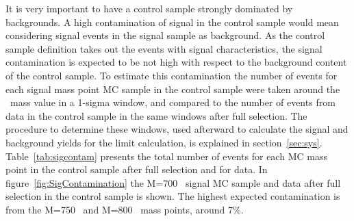 It is very important to have a control sample strongly dominated by backgrounds. A high contamination of signal in the control sample would mean considering signal events in the signal sample as background. As the control sample definition takes out the events with signal characteristics, the signal contamination is expected to be not high with respect to the background content of the control sample. To estimate this contamination the number of events for each signal mass point MC sample in the control sample were taken around the \Tp~mass value in a 1-sigma window, and compared to the number of events from data in the control sample in the same windows after full selection. The procedure to determine these windows, used afterward to calculate the signal and background yields for the limit calculation, is explained in section~\ref{sec:sys}. Table~\ref{tab:sigcontam} presents the total number of events for each MC mass point in the control sample after full selection and for data. In figure~\ref{fig:SigContamination} the M=700 \GeVcc~signal MC sample and data after full selection in the control sample is shown. The highest expected contamination is from the M=750 \GeVcc~and M=800 \GeVcc~mass points, around 7\%. %

\begin{table*}[htbH]
\begin{center}
\caption{Number of events in the control sample for signal MC samples and data after full selection in a window corresponding to one $\sigma$ for each mass point, as it will be explained in section~\ref{sec:sys}. The contamination is evaluated as the ratio of the number of events in the control sample for each mass point and data. \label{tab:sigcontam}}
\end{center}
\end{table*}

